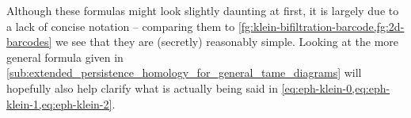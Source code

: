 \documentclass[12pt]{article}
\numberwithin{equation}{subsection}
\numberwithin{theorem}{subsection}
\numberwithin{lemma}{subsection}
\numberwithin{corollary}{subsection}
\numberwithin{definition}{subsection}
\numberwithin{example}{subsection}
\numberwithin{note}{subsection}
\newcommand{\zz}{\mathbb{Z}}
\begin{document}
            
            Although these formulas might look slightly daunting at first, it is largely due to a lack of concise notation -- comparing them to \cref{fg:klein-bifiltration-barcode,fg:2d-barcodes} we see that they are (secretly) reasonably simple.
            Looking at the more general formula given in \cref{sub:extended_persistence_homology_for_general_tame_diagrams} will hopefully also help clarify what is actually being said in \cref{eq:eph-klein-0,eq:eph-klein-1,eq:eph-klein-2}.
\end{document}
